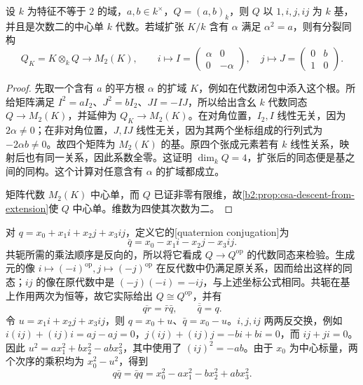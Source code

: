 \begin{proposition}\label{b2:prop:quaternion-basis-splitting}
	设 \(k\) 为特征不等于 \(2\) 的域，\(a,b\in k^\times\)，\(Q=(a,b)_k\)，则 \(Q\) 以 \(1,i,j,ij\) 为 \(k\) 基，并且是次数二的中心单 \(k\) 代数。若域扩张 \(K/k\) 含有 \(\alpha\) 满足 \(\alpha^2=a\)，则有分裂同构
	\[
		Q_K=K\otimes_kQ\longrightarrow M_2(K),\qquad
		i\longmapsto I=\begin{pmatrix}\alpha&0\\0&-\alpha\end{pmatrix},
		\quad j\longmapsto J=\begin{pmatrix}0&b\\1&0\end{pmatrix}.
	\]
\end{proposition}
\begin{proof}
	先取一个含有 \(a\) 的平方根 \(\alpha\) 的扩域 \(K\)，例如在代数闭包中添入这个根。所给矩阵满足 \(I^2=aI_2\)、\(J^2=bI_2\)、\(JI=-IJ\)，所以给出含幺 \(k\) 代数同态 \(Q\to M_2(K)\)，并延伸为 \(Q_K\to M_2(K)\)。在对角位置，\(I_2,I\) 线性无关，因为 \(2\alpha\ne0\)；在非对角位置，\(J,IJ\) 线性无关，因为其两个坐标组成的行列式为 \(-2\alpha b\ne0\)。故四个矩阵为 \(M_2(K)\) 的基。原四个张成元素若有 \(k\) 线性关系，映射后也有同一关系，因此系数全零。这证明 \(\dim_kQ=4\)，扩张后的同态便是基之间的同构。这个计算对任意含有 \(\alpha\) 的扩域都成立。

	矩阵代数 \(M_2(K)\) 中心单，而 \(Q\) 已证非零有限维，故\cref{b2:prop:csa-descent-from-extension}使 \(Q\) 中心单。维数为四使其次数为二。
\end{proof}

对 \(q=x_0+x_1i+x_2j+x_3ij\)，定义它的[quaternion conjugation]为
\[
	\bar q=x_0-x_1i-x_2j-x_3ij.
\]
共轭所需的乘法顺序是反向的，所以将它看成 \(Q\to Q^{\mathrm{op}}\) 的代数同态来检验。生成元的像 \(i\mapsto(-i)^{\mathrm{op}},j\mapsto(-j)^{\mathrm{op}}\) 在反代数中仍满足原关系，因而给出这样的同态；\(ij\) 的像在原代数中是 \((-j)(-i)=-ij\)，与上述坐标公式相同。共轭在基上作用两次为恒等，故它实际给出 \(Q\cong Q^{\mathrm{op}}\)，并有
\begin{equation}\label{b2:eq:quaternion-conjugation}
	\overline{qr}=\bar r\bar q,\qquad\overline{\bar q}=q.
\end{equation}
令 \(u=x_1i+x_2j+x_3ij\)，则 \(q=x_0+u\)、\(\bar q=x_0-u\)。\(i,j,ij\) 两两反交换，例如 \(i(ij)+(ij)i=aj-aj=0\)，\(j(ij)+(ij)j=-bi+bi=0\)，而 \(ij+ji=0\)。因此 \(u^2=ax_1^2+bx_2^2-abx_3^2\)，其中使用了 \((ij)^2=-ab\)。由于 \(x_0\) 为中心标量，两个次序的乘积均为 \(x_0^2-u^2\)，得到
\begin{equation}\label{b2:eq:quaternion-norm}
	q\bar q=\bar q q =x_0^2-a x_1^2-b x_2^2+ab x_3^2.
\end{equation}

